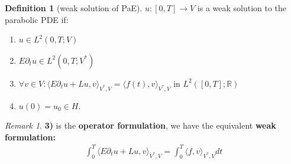 \documentclass[a4paper,11pt,oneside,fleqn]{book}
\theoremstyle{definition}
\newtheorem{definition}{Definition}[section]
\theoremstyle{remark}
\newtheorem*{remark}{Remark}
\begin{document}
 \begin{definition}[weak solution of PaE]
 	$u: [0, T] \rightarrow V$ is a weak solution to the parabolic PDE if:
 	\begin{enumerate}
 		\item $u \in L^2(0, T; V)$
 		\item $E \partial_t u \in L^2(0, T; V^*)$
 		\item $\forall v \in V: \langle E \partial_t u + L u , v \rangle_{V^*, V} = \langle f(t), v \rangle_{V^*, V}$ in $L^2([0, T]; \mathbb{R})$
 		\item $u(0) = u_0 \in H$. 
 	\end{enumerate}
 \end{definition}
 \begin{remark}
 \textbf{3)} is the \textbf{operator formulation}, we have the equivalent \textbf{weak formulation:}
 \begin{align*}
 	\int_0^T \langle E\partial_t u + Lu, v\rangle_{V^*, V}  = \int_0^T \langle f, v \rangle_{V^*, V} dt
 \end{align*}	
 \end{remark}
\end{document}
